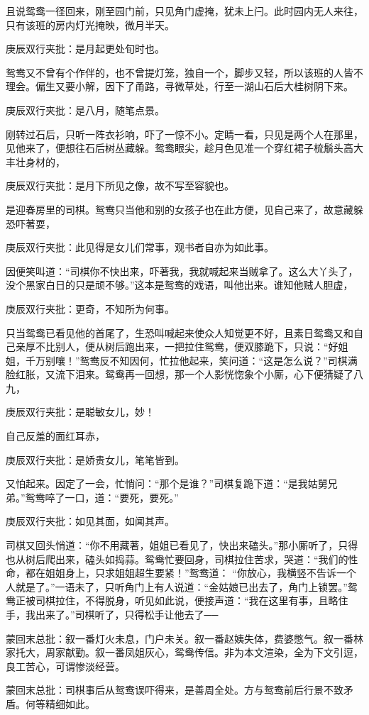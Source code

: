 \begin{parag}
    且说鸳鸯一径回来，刚至园门前，只见角门虚掩，犹未上闩。此时园内无人来往，只有该班的房内灯光掩映，微月半天。\begin{note}庚辰双行夹批：是月起更处旬时也。\end{note}鸳鸯又不曾有个作伴的，也不曾提灯笼，独自一个，脚步又轻，所以该班的人皆不理会。偏生又要小解，因下了甬路，寻微草处，行至一湖山石后大桂树阴下来。\begin{note}庚辰双行夹批：是八月，随笔点景。\end{note}刚转过石后，只听一阵衣衫响，吓了一惊不小。定睛一看，只见是两个人在那里，见他来了，便想往石后树丛藏躲。鸳鸯眼尖，趁月色见准一个穿红裙子梳鬅头高大丰壮身材的，\begin{note}庚辰双行夹批：是月下所见之像，故不写至容貌也。\end{note}是迎春房里的司棋。鸳鸯只当他和别的女孩子也在此方便，见自己来了，故意藏躲恐吓著耍，\begin{note}庚辰双行夹批：此见得是女儿们常事，观书者自亦为如此事。\end{note}因便笑叫道：“司棋你不快出来，吓著我，我就喊起来当贼拿了。这么大丫头了，没个黑家白日的只是顽不够。”这本是鸳鸯的戏语，叫他出来。谁知他贼人胆虚，\begin{note}庚辰双行夹批：更奇，不知所为何事。\end{note}只当鸳鸯已看见他的首尾了，生恐叫喊起来使众人知觉更不好，且素日鸳鸯又和自己亲厚不比别人，便从树后跑出来，一把拉住鸳鸯，便双膝跪下，只说：“好姐姐，千万别嚷！”鸳鸯反不知因何，忙拉他起来，笑问道：“这是怎么说？”司棋满脸红胀，又流下泪来。鸳鸯再一回想，那一个人影恍惚象个小厮，心下便猜疑了八九，\begin{note}庚辰双行夹批：是聪敏女儿，妙！\end{note}自己反羞的面红耳赤，\begin{note}庚辰双行夹批：是娇贵女儿，笔笔皆到。\end{note}又怕起来。因定了一会，忙悄问：“那个是谁？”司棋复跪下道：“是我姑舅兄弟。”鸳鸯啐了一口，道：“要死，要死。”\begin{note}庚辰双行夹批：如见其面，如闻其声。\end{note}司棋又回头悄道：“你不用藏著，姐姐已看见了，快出来磕头。”那小厮听了，只得也从树后爬出来，磕头如捣蒜。鸳鸯忙要回身，司棋拉住苦求，哭道：“我们的性命，都在姐姐身上，只求姐姐超生要紧！”鸳鸯道： “你放心，我横竖不告诉一个人就是了。”一语未了，只听角门上有人说道：“金姑娘已出去了，角门上锁罢。”鸳鸯正被司棋拉住，不得脱身，听见如此说，便接声道：“我在这里有事，且略住手，我出来了。”司棋听了，只得松手让他去了──
\end{parag}


\begin{parag}
    \begin{note}蒙回末总批：叙一番灯火未息，门户未关。叙一番赵姨失体，费婆憋气。叙一番林家托大，周家献勤。叙一番凤姐灰心，鸳鸯传信。非为本文渲染，全为下文引逗，良工苦心，可谓惨淡经营。\end{note}
\end{parag}


\begin{parag}
    \begin{note}蒙回末总批：司棋事后从鸳鸯误吓得来，是善周全处。方与鸳鸯前后行景不致矛盾。何等精细如此。\end{note}
\end{parag}
